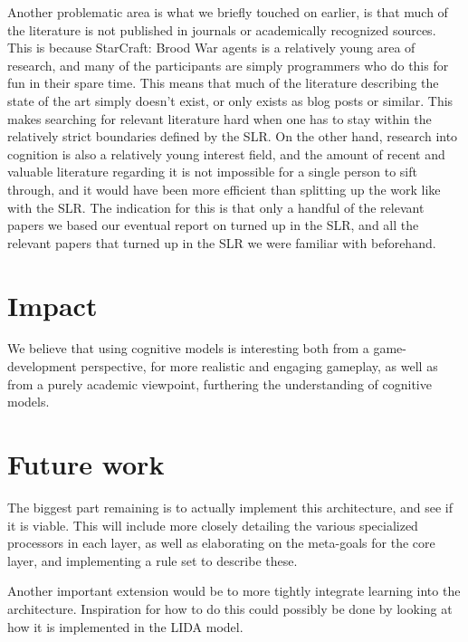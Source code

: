 Another problematic area is what we briefly touched on earlier, is that much of
the literature is not published in journals or academically recognized sources.
This is because StarCraft: Brood War agents is a relatively young area of
research, and many of the participants are simply programmers who do this for
fun in their spare time. This means that much of the literature describing the
state of the art simply doesn't exist, or only exists as blog posts or similar.
This makes searching for relevant literature hard when one has to stay within
the relatively strict boundaries defined by the SLR. On the other hand,
research into cognition is also a relatively young interest field, and the
amount of recent and valuable literature regarding it is not impossible for a
single person to sift through, and it would have been more efficient than
splitting up the work like with the SLR. The indication for this is that only a
handful of the relevant papers we based our eventual report on turned up in the
SLR, and all the relevant papers that turned up in the SLR we were familiar
with beforehand.


\section{Impact}
We believe that using cognitive models is interesting both from a
game-development perspective, for more realistic and engaging gameplay, as well
as from a purely academic viewpoint, furthering the understanding of cognitive
models.

\section{Future work}
\label{sec:futurework}
The biggest part remaining is to actually implement this architecture, and see
if it is viable. This will include more closely detailing the various
specialized processors in each layer, as well as elaborating on the meta-goals
for the core layer, and implementing a rule set to describe these.

Another important extension would be to more tightly integrate learning into
the architecture. Inspiration for how to do this could possibly be done by
looking at how it is implemented in the LIDA model\cite{franklin2007lida}.